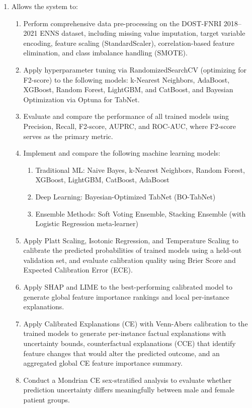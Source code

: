 \begin{enumerate}
    \item Allows the system to:
    \begin{enumerate}
        \item Perform comprehensive data pre-processing on the DOST-FNRI 2018--2021 ENNS dataset, including missing value imputation, target variable encoding, feature scaling (StandardScaler), correlation-based feature elimination, and class imbalance handling (SMOTE).
        \item Apply hyperparameter tuning via RandomizedSearchCV (optimizing for F2-score) to the following models: k-Nearest Neighbors, AdaBoost, XGBoost, Random Forest, LightGBM, and CatBoost, and Bayesian Optimization via Optuna for TabNet.
        \item Evaluate and compare the performance of all trained models using Precision, Recall, F2-score, AUPRC, and ROC-AUC, where F2-score serves as the primary metric.
        \item Implement and compare the following machine learning models:
        \begin{enumerate}
            \item Traditional ML: Naive Bayes, k-Nearest Neighbors, Random Forest, XGBoost, LightGBM, CatBoost, AdaBoost
            \item Deep Learning: Bayesian-Optimized TabNet (BO-TabNet)
            \item Ensemble Methods: Soft Voting Ensemble, Stacking Ensemble (with Logistic Regression meta-learner)
        \end{enumerate}
        \item Apply Platt Scaling, Isotonic Regression, and Temperature Scaling to calibrate the predicted probabilities of trained models using a held-out validation set, and evaluate calibration quality using Brier Score and Expected Calibration Error (ECE).
        \item Apply SHAP and LIME to the best-performing calibrated model to generate global feature importance rankings and local per-instance explanations.
        \item Apply Calibrated Explanations (CE) with Venn-Abers calibration to the trained models to generate per-instance factual explanations with uncertainty bounds, counterfactual explanations (CCE) that identify feature changes that would alter the predicted outcome, and an aggregated global CE feature importance summary.
        \item Conduct a Mondrian CE sex-stratified analysis to evaluate whether prediction uncertainty differs meaningfully between male and female patient groups.
    \end{enumerate}


\end{enumerate}
